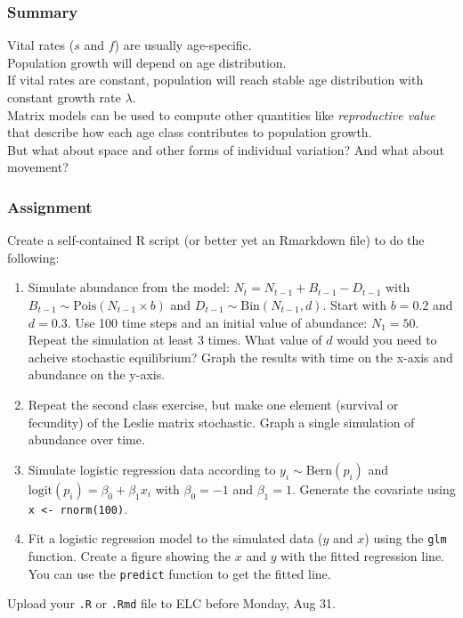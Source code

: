 \documentclass[color=usenames,dvipsnames]{beamer}\usepackage[]{graphicx}\usepackage[]{color}
\newcommand{\inr}[1]{\colorbox{inlinecolor}{\texttt{#1}}}
\begin{document}











\begin{frame}
  \frametitle{Summary}
  Vital rates ($s$ and $f$) are usually age-specific. \\
  \pause
  \vfill
  Population growth will depend on age distribution. \\
  \pause
  \vfill
  If vital rates are constant, population will reach stable
  age distribution with constant growth rate $\lambda$. \\
  \pause
  \vfill
  Matrix models can be used to compute other quantities like
  \emph{reproductive value} that describe how each age class
  contributes to population growth. \\
  \pause
  \vfill
  But what about space and other forms of individual variation? And
  what about movement?
\end{frame}



    

\begin{frame}
  \frametitle{Assignment}
  \scriptsize
  Create a self-contained R script (or better yet an Rmarkdown file)
  to do the following:
  \begin{enumerate}
    \scriptsize
    \item Simulate abundance from the model: $N_t = N_{t-1} + B_{t-1}
      - D_{t-1}$ with $B_{t-1} \sim \mathrm{Pois}(N_{t-1} \times b)$ and
      $D_{t-1} \sim \mathrm{Bin}(N_{t-1}, d)$. Start with $b=0.2$ and
      $d=0.3$. Use 100 time steps and an initial value of abundance:
      $N_1=50$. Repeat the simulation at least 3 times. What value of
      $d$ would you need to acheive stochastic equilibrium? Graph the
      results with time on the x-axis and abundance on the y-axis.
    \item Repeat the second class exercise, but make one element
      (survival or fecundity) of the Leslie matrix stochastic. Graph a
      single simulation of abundance over time.
    \item Simulate logistic regression data according to
      $y_i \sim \mathrm{Bern}(p_i)$ and $\mathrm{logit}(p_i) = \beta_0
      + \beta_1 x_i$ with $\beta_0=-1$ and $\beta_1=1$. Generate the
      covariate using \inr{x <- rnorm(100)}.
    \item Fit a logistic regression model to the simulated data ($y$
      and $x$) using the \inr{glm} function. Create a figure showing
      the $x$ and $y$ with the fitted regression line. You can use the
      \inr{predict} function to get the fitted line.
  \end{enumerate}
  Upload your {\tt .R} or {\tt .Rmd} file to ELC before Monday, Aug 31. 
\end{frame}
\end{document}

